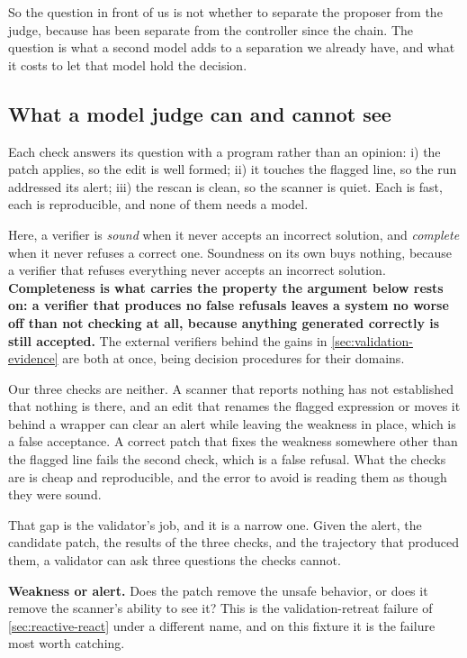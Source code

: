 So the question in front of us is not whether to separate the proposer from the judge, because
 has been separate from the controller since the chain. The question is what a
second model adds to a separation we already have, and what it costs to let that model hold the
decision.

\subsection{What a model judge can and cannot see}
\label{sec:validation-judge}

Each check answers its question with a program rather than an opinion: i) the patch applies, so the
edit is well formed; ii) it touches the flagged line, so the run addressed its alert; iii) the
rescan is clean, so the scanner is quiet. Each is fast, each is reproducible,
and none of them needs a model.

Here, a verifier is \emph{sound} when it never accepts an incorrect solution, and \emph{complete}
when it never refuses a correct one. Soundness on its own buys nothing, because a verifier that
refuses everything never accepts an incorrect solution. \textbf{Completeness is what carries the
property the argument below rests on: a verifier that produces no false refusals leaves a system no
worse off than not checking at all, because anything generated correctly is still accepted.} The
external verifiers behind the gains in \cref{sec:validation-evidence} are both at once, being
decision procedures for their domains.

Our three checks are neither. A scanner that reports nothing has not established that nothing is
there, and an edit that renames the flagged expression or moves it behind a wrapper can clear an
alert while leaving the weakness in place, which is a false acceptance. A correct patch that fixes
the weakness somewhere other than the flagged line fails the second check, which is a false refusal.
What the checks are is cheap and reproducible, and the error to avoid is reading them as though they
were sound.

That gap is the validator's job, and it is a narrow one. Given the alert, the candidate patch, the
results of the three checks, and the trajectory that produced them, a validator can ask three
questions the checks cannot.

\bi

\item \textbf{Weakness or alert.} Does the patch remove the unsafe behavior, or does it remove the
scanner's ability to see it? This is the validation-retreat failure of \cref{sec:reactive-react}
under a different name, and on this fixture it is the failure most worth catching.

